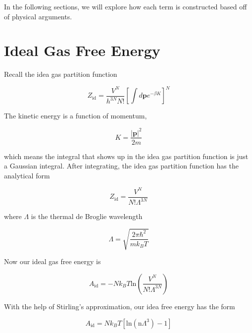 In the following sections, we will explore how each term is constructed based off of physical arguments. 




















\section{Ideal Gas Free Energy}

Recall the idea gas partition function

\begin{equation}
Z_{\text{id}} =    \frac{V^N}{h^{3N} N!}  \left[ \int d\textbf{p} e^{-\beta K } \right]^N 
\end{equation} 

The kinetic energy is a function of momentum,

\begin{equation}
K = \frac{| \textbf{p}|^2}{2m}
\end{equation}  

which means the integral that shows up in the idea gas partition function is just a Gaussian integral.  After integrating, the idea gas partition function has the analytical form

\begin{equation}
Z_{\text{id}} = \frac{V^N}{N! \Lambda^{3N}}
\end{equation}

where $\Lambda$ is the thermal de Broglie wavelength

\begin{equation}
\Lambda = \sqrt{\frac{2 \pi \hbar^2}{m k_B T}}
\end{equation}

Now our ideal gas free energy is

\begin{equation}
A_{\text{id}} = - N k_B T \text{ln} \left(  \frac{V^N}{N! \Lambda^{3N}}  \right)
\end{equation}

With the help of Stirling's approximation, our idea free energy has the form

\begin{equation}
A_{\text{id}} = N k_B T [ \text{ln} ( \text{n} \Lambda^3) -1 ]
\end{equation}

